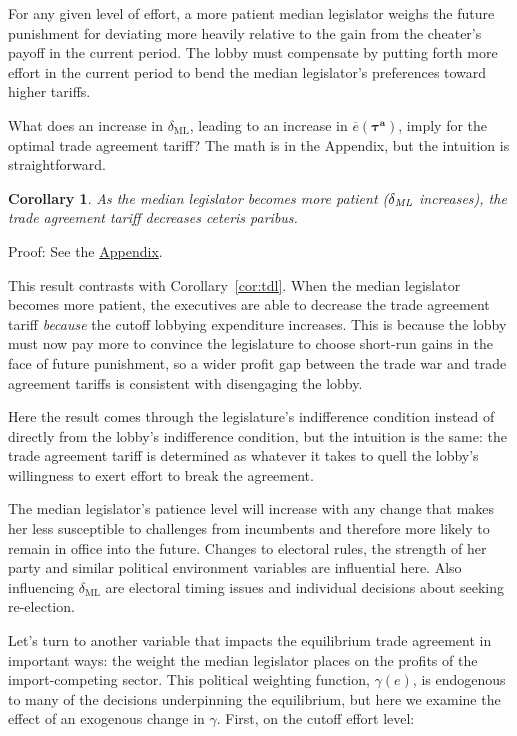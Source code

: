 \documentclass[authoryear, review]{elsarticle}
\newtheorem{corollary}{Corollary}
\newcommand{\ov}{\overline}
\newcommand{\bta}{\bm{\tau^a}}
\newcommand{\ga}{\gamma}
\newcommand{\de}{\delta}
\begin{document}
\noindent For any given level of effort, a more patient median legislator weighs the future punishment for deviating more heavily relative to the gain from the cheater's payoff in the current period. The lobby must compensate by putting forth more effort in the current period to bend the median legislator's preferences toward higher tariffs.

What does an increase in $\de_\text{ML}$, leading to an increase in $\ov{e}(\bta)$, imply for the optimal trade agreement tariff? The math is in the Appendix, but the intuition is straightforward.

\begin{corollary}
  As the median legislator becomes more patient ($\de_\emph{ML}$ increases), the trade agreement tariff decreases \emph{ceteris paribus}.
  \label{cor:tdm}
\end{corollary}
Proof: See the \hyperlink{Cor_tdm}{Appendix}.

\noindent This result contrasts with Corollary~\ref{cor:tdl}. When the median legislator becomes more patient, the executives are able to decrease the trade agreement tariff \textit{because} the cutoff lobbying expenditure increases. This is because the lobby must now pay more to convince the legislature to choose short-run gains in the face of future punishment, so a wider profit gap between the trade war and trade agreement tariffs is consistent with disengaging the lobby.

Here the result comes through the legislature's indifference condition instead of directly from the lobby's indifference condition, but the intuition is the same: the trade agreement tariff is determined as whatever it takes to quell the lobby's willingness to exert effort to break the agreement.

The median legislator's patience level will increase with any change that makes her less susceptible to challenges from incumbents and therefore more likely to remain in office into the future. Changes to electoral rules, the strength of her party and similar political environment variables are influential here. Also influencing $\de_\text{ML}$ are electoral timing issues and individual decisions about seeking re-election.

Let's turn to another variable that impacts the equilibrium trade agreement in important ways: the weight the median legislator places on the profits of the import-competing sector. This political weighting function, $\ga(e)$, is endogenous to many of the decisions underpinning the equilibrium, but here we examine the effect of an exogenous change in $\ga$. First, on the cutoff effort level:
\end{document}
